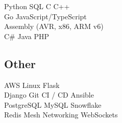 \documentclass[letterpaper]{deedy-resume} %
\begin{document}
\begin{minipage}[t]{0.33\textwidth}
Python \textbullet{} SQL \textbullet{} C \textbullet{} C++\\
Go \textbullet{} JavaScript/TypeScript\\
Assembly (AVR, x86, ARM v6)\\
C\# \textbullet{} Java \textbullet{} PHP \\

\subsection{Other}
AWS \textbullet{} Linux \textbullet{} Flask \\
Django \textbullet{} Git \textbullet{} CI / CD \textbullet{} Ansible \\
PostgreSQL \textbullet{} MySQL \textbullet{} Snowflake\\
Redis \textbullet{} Mesh Networking \textbullet{} WebSockets

\sectionspace %


\end{minipage} %
\hfill
%
%
\end{document}
